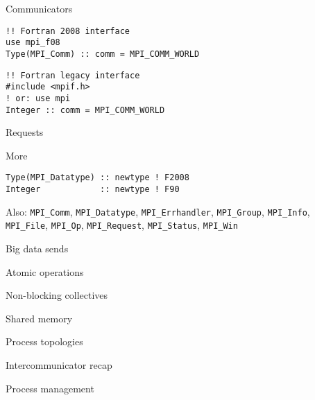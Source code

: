 \documentclass[11pt,headernav]{beamer}
\begin{document}
\begin{frame}[containsverbatim]{Communicators}
\begin{lstlisting}
!! Fortran 2008 interface
use mpi_f08
Type(MPI_Comm) :: comm = MPI_COMM_WORLD
\end{lstlisting}
\begin{lstlisting}
!! Fortran legacy interface
#include <mpif.h>
! or: use mpi
Integer :: comm = MPI_COMM_WORLD
\end{lstlisting}
\end{frame}

\begin{frame}[containsverbatim]{Requests}
\end{frame}

\begin{frame}[containsverbatim]{More}
\begin{lstlisting}
Type(MPI_Datatype) :: newtype ! F2008
Integer            :: newtype ! F90
\end{lstlisting}

Also:
  \lstinline{MPI_Comm}, \lstinline{MPI_Datatype},
  \lstinline{MPI_Errhandler}, \lstinline{MPI_Group},
  \lstinline{MPI_Info}, \lstinline{MPI_File}, \lstinline{MPI_Op},
  \lstinline{MPI_Request}, \lstinline{MPI_Status}, \lstinline{MPI_Win}
\end{frame}

\lstset{language=C}

 {Big data sends}


 {Atomic operations}

%
 
 {Non-blocking collectives}


 {Shared memory}


 {Process topologies}


 {Intercommunicator recap}





 {Process management}



\begin{comment}
  \begin{frame}{Protocol}
    \label{sl:rendezvous}
    Communication is a `rendez-vous' or `hand-shake' protocol:
    \begin{itemize}
    \item Sender: `I have data for you'
    \item Receiver: `I have a buffer ready, send it over'
    \item Sender: `Ok, here it comes'
    \item Receiver: `Got it.'
    \end{itemize}
    Small messages bypass this: `eager' send.\\
    Definition of `small message' controlled by environment variables.
  \end{frame}
\end{comment}
\end{document}
